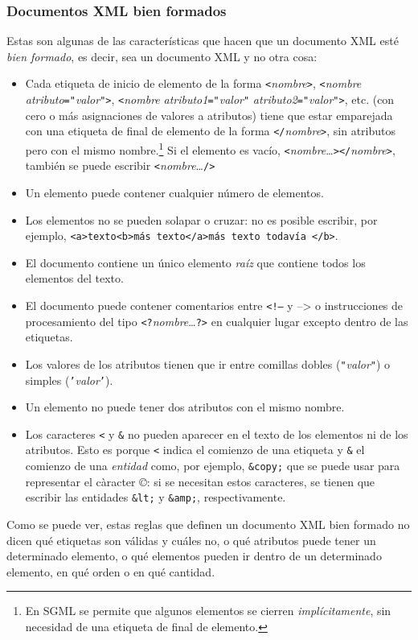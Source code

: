 \subsubsection{Documentos XML bien formados} Estas son algunas de las características que hacen que un documento XML esté \emph{bien formado}, es decir, sea un documento XML y no otra cosa: \begin{itemize} \item Cada etiqueta de inicio de elemento de la forma \texttt{<}\emph{nombre}\texttt{>}, \texttt{<}\emph{nombre} \emph{atributo}\texttt{=}\texttt{"}\emph{valor}\texttt{"}\texttt{>}, \texttt{<}\emph{nombre} \emph{atributo1}\texttt{=}\texttt{"}\emph{valor}\texttt{"} \emph{atributo2}\texttt{=}\texttt{"}\emph{valor}\texttt{"}\texttt{>}, etc. (con cero o más asignaciones de valores a atributos) tiene que estar emparejada con una etiqueta de final de elemento de la forma \texttt{</}\emph{nombre}\texttt{>}, sin atributos pero con el mismo nombre.\footnote{En SGML se permite que algunos elementos se cierren \emph{implícitamente}, sin necesidad de una etiqueta de final de elemento.} Si el elemento es vacío, \texttt{<}\emph{nombre}\ldots\texttt{></}\emph{nombre}\texttt{>}, también se puede escribir \texttt{<}\emph{nombre}\ldots\texttt{/>} \item Un elemento puede contener cualquier número de elementos. \item Los elementos no se pueden solapar o cruzar: no es posible escribir, por ejemplo, \texttt{<a>texto<b>más texto</a>más texto todavía </b>}. \item El documento contiene un único elemento \emph{raíz} que contiene todos los elementos del texto. \item El documento puede contener comentarios entre \texttt{<!--} y --> \texttt{} o instrucciones de procesamiento del tipo \texttt{<?}\emph{nombre}\ldots\texttt{?>} en cualquier lugar excepto dentro de las etiquetas. \item Los valores de los atributos tienen que ir entre comillas dobles (\texttt{"}\emph{valor}\texttt{"}) o simples (\texttt{'}\emph{valor}\texttt{'}). \item Un elemento no puede tener dos atributos con el mismo nombre. \item Los caracteres \texttt{<} y \texttt{\&} no pueden aparecer en el texto de los elementos ni de los atributos. Esto es porque \texttt{<} indica el comienzo de una etiqueta y \texttt{\&} el comienzo de una \emph{entidad} como, por ejemplo, \texttt{\&copy;} que se puede usar para representar el càracter \emph{©}: si se necesitan estos caracteres, se tienen que escribir las entidades \texttt{\&lt;} y \texttt{\&amp;}, respectivamente. \end{itemize} Como se puede ver, estas reglas que definen un documento XML bien formado no dicen qué etiquetas son válidas y cuáles no, o qué atributos puede tener un determinado elemento, o qué elementos pueden ir dentro de un determinado elemento, en qué orden o en qué cantidad. 

